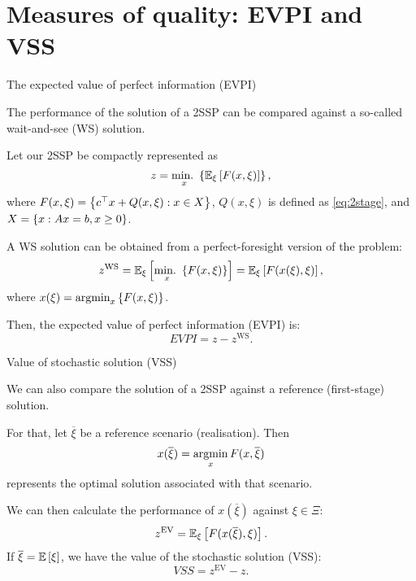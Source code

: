 \section{Measures of quality: EVPI and VSS}


\begin{frame}{The expected value of perfect information (EVPI)}

	The performance of the solution of a 2SSP can be compared against a so-called \alert{wait-and-see} (WS) solution.
	
	Let our 2SSP be compactly represented as
	\begin{equation*}
		z = \mathop{\text{min.} \ }_x \left\{ \mathbb{E}_\xi\left[ F(x,\xi) \right] \right \}, 	
	\end{equation*}
	where $F(x,\xi) = \left\{ c^\top x + Q(x,\xi) : x \in X \right \}$, $Q(x,\xi)$ is defined as \eqref{eq:2stage}, and $X=\left\{ x : Ax = b, x \ge 0 \right \}$.
	
	\pause
	A WS solution can be obtained from a \alert{perfect-foresight} version of the problem:
	\begin{equation*}
		z^{\text{WS}} = \mathbb{E}_\xi\left[ \mathop{\text{min.} \ }_x \left\{ F(x,\xi) \right \} \right] = \mathbb{E}_\xi\left[ F(x(\xi), \xi) \right],
	\end{equation*}
	where $x(\xi) = \mathop{\rm argmin}_x \left\{ F(x,\xi) \right \}$.
	
	\pause
	Then, the expected value of perfect information (EVPI) is: 
	$$
		EVPI = z - z^{\text{WS}}.
	$$
\end{frame}


\begin{frame}{Value of stochastic solution (VSS)}

	We can also compare the solution of a 2SSP against a \alert{reference (first-stage) solution}. 
	
	For that, let $\overline{\xi}$ be a reference scenario (realisation). Then
	$$
		x(\overline{\xi}) = \mathop{\rm argmin}_x F(x, \overline{\xi}) 
	$$
	represents the optimal solution associated with that scenario.
	
	\pause
	
	We can then calculate the performance of $x(\overline{\xi})$ against $\xi \in \Xi$:		 
	$$
		z^{\text{EV}} = \mathbb{E}_\xi\left[ F(x(\overline{\xi}), \xi) \right].
	$$
	If $\overline{\xi} = \mathbb{E}\left[ \xi \right]$, we have the \alert{value of the stochastic solution (VSS)}:
	$$
		VSS = z^{\text{EV}} - z.
	$$
	
\end{frame}

